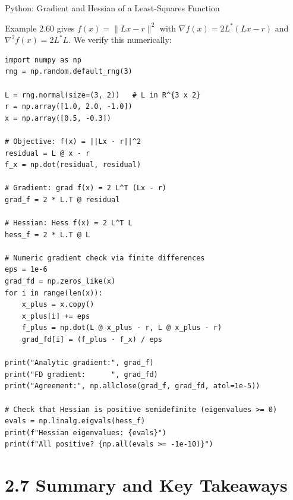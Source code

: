 \documentclass[aspectratio=169,10pt]{beamer}
\begin{document}
\begin{frame}[fragile]{Python: Gradient and Hessian of a Least-Squares Function}

Example 2.60 gives $f(x) = \|Lx - r\|^2$ with $\nabla f(x) = 2L^*(Lx-r)$
and $\nabla^2 f(x) = 2L^*L$. We verify this numerically:

\begin{lstlisting}[style=pycode]
import numpy as np
rng = np.random.default_rng(3)

L = rng.normal(size=(3, 2))   # L in R^{3 x 2}
r = np.array([1.0, 2.0, -1.0])
x = np.array([0.5, -0.3])

# Objective: f(x) = ||Lx - r||^2
residual = L @ x - r
f_x = np.dot(residual, residual)

# Gradient: grad f(x) = 2 L^T (Lx - r)
grad_f = 2 * L.T @ residual

# Hessian: Hess f(x) = 2 L^T L
hess_f = 2 * L.T @ L

# Numeric gradient check via finite differences
eps = 1e-6
grad_fd = np.zeros_like(x)
for i in range(len(x)):
    x_plus = x.copy()
    x_plus[i] += eps
    f_plus = np.dot(L @ x_plus - r, L @ x_plus - r)
    grad_fd[i] = (f_plus - f_x) / eps

print("Analytic gradient:", grad_f)
print("FD gradient:      ", grad_fd)
print("Agreement:", np.allclose(grad_f, grad_fd, atol=1e-5))

# Check that Hessian is positive semidefinite (eigenvalues >= 0)
evals = np.linalg.eigvals(hess_f)
print(f"Hessian eigenvalues: {evals}")
print(f"All positive? {np.all(evals >= -1e-10)}")
\end{lstlisting}
\end{frame}

\section{2.7 Summary and Key Takeaways}
\end{document}
